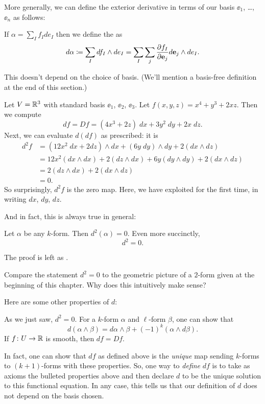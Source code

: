 More generally, we can define the exterior derivative
in terms of our basis $\ee_1$, \dots, $\ee_n$ as follows:
\begin{definition}
If $\alpha = \sum_I f_I de_I$ then we define the  as
\[ d\alpha \coloneqq \sum_I df_I \wedge de_I
	= \sum_I \sum_j \frac{\partial f_I}{\partial \mathbf e_j} d\mathbf e_j \wedge de_I. \]
\end{definition}
This doesn't depend on the choice of basis.
(We'll mention a basis-free definition at the end of this section.)

\begin{example}
	Let $V = \mathbb R^3$ with standard basis $\ee_1$, $\ee_2$, $\ee_3$.
	Let $f(x,y,z) = x^4 + y^3 + 2xz$.
	Then we compute
	\[ df = Df = (4x^3+2z) \; dx + 3y^2 \; dy + 2x \; dz. \]
	Next, we can evaluate $d(df)$ as prescribed: it is
	\begin{align*}
		d^2f &= (12x^2 \; dx + 2 dz) \wedge dx + (6y \; dy) \wedge dy
		+ 2(dx \wedge dz) \\
		&= 12x^2 (dx \wedge dx) + 2(dz \wedge dx) + 6y (dy \wedge dy) + 2(dx \wedge dz) \\
		&= 2(dz \wedge dx) + 2(dx \wedge dz) \\
		&= 0.
	\end{align*}
	So surprisingly, $d^2f$ is the zero map.
	Here, we have exploited  for the first time,
	in writing $dx$, $dy$, $dz$.
\end{example}
And in fact, this is always true in general:
\begin{theorem}
	\label{thm:dd_zero}
	Let $\alpha$ be any $k$-form.
	Then $d^2(\alpha) = 0$.
	Even more succinctly, \[ d^2 = 0. \]
\end{theorem}
The proof is left as .
\begin{exercise}
	Compare the statement $d^2 = 0$ to the geometric
	picture of a $2$-form given at the beginning of this chapter.
	Why does this intuitively make sense?
\end{exercise}

Here are some other properties of $d$:
\begin{itemize}
	\ii As we just saw, $d^2 = 0$.
	\ii For a $k$-form $\alpha$ and $\ell$-form $\beta$, one can show that
	\[ d(\alpha \wedge \beta) = d\alpha \wedge \beta + (-1)^k (\alpha \wedge d\beta). \]
	\ii If $f \colon U \to \mathbb R$ is smooth, then $df = Df$.
\end{itemize}
In fact, one can show that $df$ as defined above is
the \emph{unique} map sending $k$-forms to $(k+1)$-forms
with these properties.
So, one way to \emph{define} $df$ is to take as axioms
the bulleted properties above
and then declare $d$ to be the unique solution to this functional equation.
In any case, this tells us that our definition of $d$
does not depend on the basis chosen.

